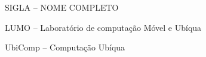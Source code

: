 \section*{} 

SIGLA		– 	NOME COMPLETO 

LUMO		–	Laboratório de computação Móvel e Ubíqua

UbiComp	–  	Computação Ubíqua 